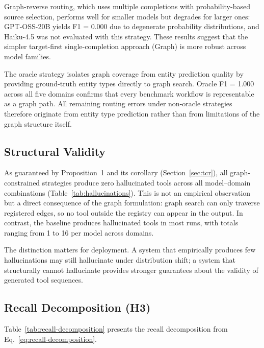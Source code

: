 Graph-reverse routing, which uses multiple completions with probability-based source selection, performs well for smaller models but degrades for larger ones: GPT-OSS-20B yields F1 = 0.000 due to degenerate probability distributions, and Haiku-4.5 was not evaluated with this strategy.
These results suggest that the simpler target-first single-completion approach (Graph) is more robust across model families.

The oracle strategy isolates graph coverage from entity prediction quality by providing ground-truth entity types directly to graph search.
Oracle F1 = 1.000 across all five domains confirms that every benchmark workflow is representable as a graph path.
All remaining routing errors under non-oracle strategies therefore originate from entity type prediction rather than from limitations of the graph structure itself.




\subsection{Structural Validity}
\label{sec:hallucinations}



As guaranteed by Proposition~1 and its corollary (Section~\ref{sec:tcr}), all graph-constrained strategies produce zero hallucinated tools across all model--domain combinations (Table~\ref{tab:hallucinations}).
This is not an empirical observation but a direct consequence of the graph formulation: graph search can only traverse registered edges, so no tool outside the registry can appear in the output.
In contrast, the baseline produces hallucinated tools in most runs, with totals ranging from 1 to 16 per model across domains.

The distinction matters for deployment.
A system that empirically produces few hallucinations may still hallucinate under distribution shift; a system that structurally cannot hallucinate provides stronger guarantees about the validity of generated tool sequences.


\subsection{Recall Decomposition (H3)}
\label{sec:recall-decomposition}

Table~\ref{tab:recall-decomposition} presents the recall decomposition from Eq.~\ref{eq:recall-decomposition}.

